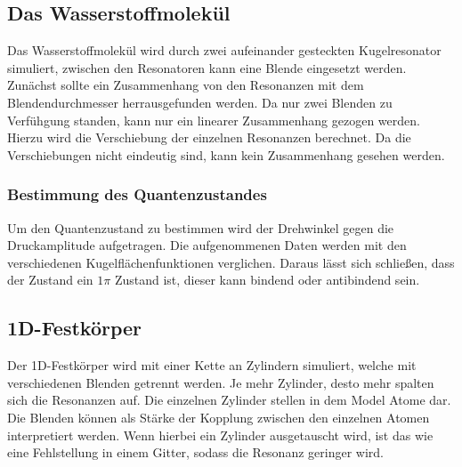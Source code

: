 \subsection{Das Wasserstoffmolekül}
Das Wasserstoffmolekül wird durch zwei aufeinander gesteckten Kugelresonator simuliert, zwischen den Resonatoren kann eine Blende 
eingesetzt werden.
Zunächst sollte ein Zusammenhang von den Resonanzen mit dem Blendendurchmesser herrausgefunden werden. Da nur zwei Blenden
zu Verfühgung standen, kann nur ein linearer Zusammenhang gezogen werden. Hierzu wird die Verschiebung der einzelnen 
Resonanzen berechnet. Da die Verschiebungen nicht eindeutig sind, kann kein Zusammenhang gesehen werden.
\subsubsection{Bestimmung des Quantenzustandes}
Um den Quantenzustand zu bestimmen wird der Drehwinkel gegen die Druckamplitude aufgetragen. Die aufgenommenen Daten werden
mit den verschiedenen Kugelflächenfunktionen verglichen. Daraus lässt sich schließen, dass der Zustand ein $1\pi$ Zustand ist,
dieser kann bindend oder antibindend sein.
\subsection{1D-Festkörper}
Der 1D-Festkörper wird mit einer Kette an Zylindern simuliert, welche mit verschiedenen Blenden getrennt werden.
Je mehr Zylinder, desto mehr spalten sich die Resonanzen auf.
Die einzelnen Zylinder stellen in dem Model Atome dar. Die Blenden können als Stärke der Kopplung zwischen den einzelnen 
Atomen interpretiert werden.
Wenn hierbei ein Zylinder ausgetauscht wird, ist das wie eine Fehlstellung in einem Gitter, sodass die Resonanz geringer wird.